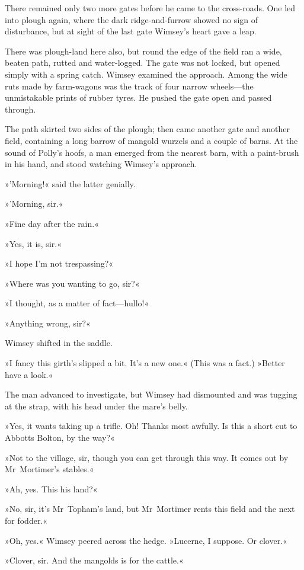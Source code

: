 There remained only two more gates before he came to the cross-roads. One led into plough again, where the dark ridge-and-furrow showed no sign of disturbance, but at sight of the last gate Wimsey's heart gave a leap.

There was plough-land here also, but round the edge of the field ran a wide, beaten path, rutted and water-logged. The gate was not locked, but opened simply with a spring catch. Wimsey examined the approach. Among the wide ruts made by farm-wagons was the track of four narrow wheels—the unmistakable prints of rubber tyres. He pushed the gate open and passed through.

The path skirted two sides of the plough; then came another gate and another field, containing a long barrow of mangold wurzels and a couple of barns. At the sound of Polly's hoofs, a man emerged from the nearest barn, with a paint-brush in his hand, and stood watching Wimsey's approach.

»'Morning!« said the latter genially.

»'Morning, sir.«

»Fine day after the rain.«

»Yes, it is, sir.«

»I hope I'm not trespassing?«

»Where was you wanting to go, sir?«

»I thought, as a matter of fact—hullo!«

»Anything wrong, sir?«

Wimsey shifted in the saddle.

»I fancy this girth's slipped a bit. It's a new one.« (This was a fact.) »Better have a look.«

The man advanced to investigate, but Wimsey had dismounted and was tugging at the strap, with his head under the mare's belly.

»Yes, it wants taking up a trifle. Oh! Thanks most awfully. Is this a short cut to Abbotts Bolton, by the way?«

»Not to the village, sir, though you can get through this way. It comes out by Mr~Mortimer's stables.«

»Ah, yes. This his land?«

»No, sir, it's Mr~Topham's land, but Mr~Mortimer rents this field and the next for fodder.«

»Oh, yes.« Wimsey peered across the hedge. »Lucerne, I suppose. Or clover.«

»Clover, sir. And the mangolds is for the cattle.«

